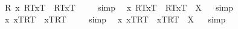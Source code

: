 \begin{isabellebody}
%
\endisatagproof
{\isafoldproof}%
%
\isadelimproof
%
\endisadelimproof
\isanewline
{}\isamarkupfalse%
\ {\isachardoublequoteopen}{\isacharbrackleft}{\isacharparenleft}\isactrlbold {\isasymforall}R{\isachardot}\ \isactrlbold {\isasymforall}{\isacharparenleft}{\isasymlambda}x{\isachardot}\ {\isasymlparr}R\isactrlsup T{\isacharcomma}x\isactrlsup T{\isasymrparr}\ \isactrlbold {\isasymrightarrow}\ {\isasymlparr}R\isactrlsup T{\isacharcomma}x\isactrlsup T{\isasymrparr}{\isacharparenright}{\isacharparenright}{\isacharbrackright}\ {\isacharequal}\ {\isasymtop}{\isachardoublequoteclose}%
\isadelimproof
\ %
\endisadelimproof
%
\isatagproof
{}\isamarkupfalse%
\ simp\ \isamarkupfalse%
%
\endisatagproof
{\isafoldproof}%
%
\isadelimproof
%
\endisadelimproof
\isanewline
{}\isamarkupfalse%
\ {\isachardoublequoteopen}{\isacharparenleft}\isactrlbold {\isasymforall}x{\isachardot}\ {\isasymlparr}R\isactrlsup T{\isacharcomma}x\isactrlsup T{\isasymrparr}\ \isactrlbold {\isasymrightarrow}\ {\isasymlparr}R\isactrlsup T{\isacharcomma}x\isactrlsup T{\isasymrparr}{\isacharparenright}\ {\isacharequal}\ X{\isachardoublequoteclose}%
\isadelimproof
\ %
\endisadelimproof
%
\isatagproof
{}\isamarkupfalse%
\ simp\ \isamarkupfalse%
%
\endisatagproof
{\isafoldproof}%
%
\isadelimproof
%
\endisadelimproof
\isanewline
\isanewline
{}\isamarkupfalse%
\ {\isachardoublequoteopen}{\isacharbrackleft}{\isacharparenleft}\isactrlbold {\isasymforall}x{\isachardot}\ {\isasymlbrace}x\isactrlsup T{\isacharcomma}R\isactrlsup T{\isasymrbrace}\ \isactrlbold {\isasymrightarrow}\ {\isasymlbrace}x\isactrlsup T{\isacharcomma}R\isactrlsup T{\isasymrbrace}{\isacharparenright}{\isacharbrackright}\ {\isacharequal}\ {\isasymtop}{\isachardoublequoteclose}%
\isadelimproof
\ %
\endisadelimproof
%
\isatagproof
{}\isamarkupfalse%
\ simp\ \isamarkupfalse%
%
\endisatagproof
{\isafoldproof}%
%
\isadelimproof
%
\endisadelimproof
\isanewline
{}\isamarkupfalse%
\ {\isachardoublequoteopen}{\isacharparenleft}\isactrlbold {\isasymforall}x{\isachardot}\ {\isasymlbrace}x\isactrlsup T{\isacharcomma}R\isactrlsup T{\isasymrbrace}\ \isactrlbold {\isasymrightarrow}\ {\isasymlbrace}x\isactrlsup T{\isacharcomma}R\isactrlsup T{\isasymrbrace}{\isacharparenright}\ {\isacharequal}\ X{\isachardoublequoteclose}%
\isadelimproof
\ %
\endisadelimproof
%
\isatagproof
{}\isamarkupfalse%
\ simp\ \isamarkupfalse%
%
\endisatagproof
{\isafoldproof}%
%
\isadelimproof

\end{isabellebody}
